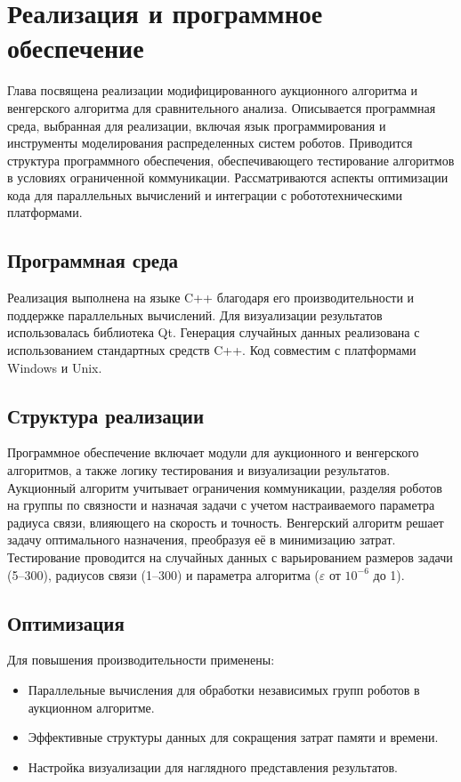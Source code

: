 \chapter{Реализация и программное обеспечение} \label{ch3}

Глава посвящена реализации модифицированного аукционного алгоритма и венгерского алгоритма для сравнительного анализа. Описывается программная среда, выбранная для реализации, включая язык программирования и инструменты моделирования распределенных систем роботов. Приводится структура программного обеспечения, обеспечивающего тестирование алгоритмов в условиях ограниченной коммуникации. Рассматриваются аспекты оптимизации кода для параллельных вычислений и интеграции с робототехническими платформами.

\section{Программная среда}

Реализация выполнена на языке C++ благодаря его производительности и поддержке параллельных вычислений. Для визуализации результатов использовалась библиотека Qt. Генерация случайных данных реализована с использованием стандартных средств C++. Код совместим с платформами Windows и Unix.

\section{Структура реализации}

Программное обеспечение включает модули для аукционного и венгерского алгоритмов, а также логику тестирования и визуализации результатов. Аукционный алгоритм учитывает ограничения коммуникации, разделяя роботов на группы по связности и назначая задачи с учетом настраиваемого параметра радиуса связи, влияющего на скорость и точность. Венгерский алгоритм решает задачу оптимального назначения, преобразуя её в минимизацию затрат. Тестирование проводится на случайных данных с варьированием размеров задачи (5–300), радиусов связи (1–300) и параметра алгоритма ($\varepsilon$ от $10^{-6}$ до 1).

\section{Оптимизация}

Для повышения производительности применены:
\begin{itemize}
  \item Параллельные вычисления для обработки независимых групп роботов в аукционном алгоритме.
  \item Эффективные структуры данных для сокращения затрат памяти и времени.
  \item Настройка визуализации для наглядного представления результатов.
\end{itemize}

